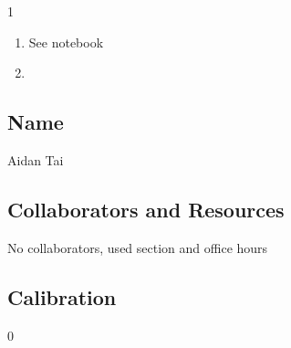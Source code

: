 \documentclass[submit]{harvardml}
\begin{document}
\newpage

\begin{sol}{}{1}
  \begin{enumerate}
    \item See notebook
    \item 
  \end{enumerate}

\end{sol}

\newpage
\subsection*{Name}
Aidan Tai

\subsection*{Collaborators and Resources}
No collaborators, used section and office hours

\subsection*{Calibration}
0
\end{document}
